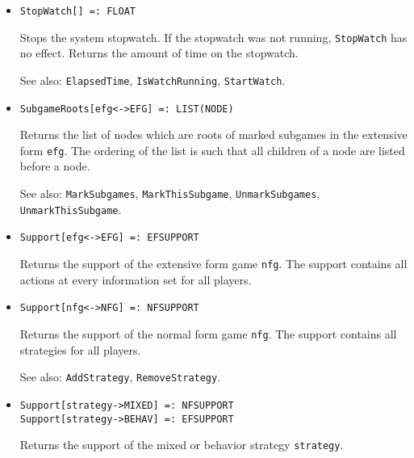 \begin{itemize}
\item
\protect \large \begin{verbatim}
StopWatch[] =: FLOAT
\end{verbatim}\normalsize

\bd
Stops the system stopwatch.  If the stopwatch was not
running, {\tt StopWatch} has no effect.  Returns the amount of time
on the stopwatch.
\item
[See also:] {\tt ElapsedTime}, {\tt IsWatchRunning}, {\tt StartWatch}.
\ed

\item
\protect \large \begin{verbatim}
SubgameRoots[efg<->EFG] =: LIST(NODE)
\end{verbatim}\normalsize

\bd Returns the list of nodes which are roots of marked subgames in
the extensive form {\tt efg}.  The ordering of the list is such that
all children of a node are listed before a node.
\item
[See also:] {\tt MarkSubgames}, {\tt MarkThisSubgame}, {\tt UnmarkSubgames},
{\tt UnmarkThisSubgame}.
\ed

\item
\protect \large \begin{verbatim}
Support[efg<->EFG] =: EFSUPPORT
\end{verbatim}\normalsize

\bd
Returns the support of the extensive form
game \verb+nfg+.  The support contains all actions at every
information set for all players.
\ed

\item
\protect \large \begin{verbatim}
Support[nfg<->NFG] =: NFSUPPORT
\end{verbatim}\normalsize

\bd
Returns the support of the normal form
game \verb+nfg+.  The support contains all strategies for all players.
\item
[See also:] {\tt AddStrategy}, {\tt RemoveStrategy}.
\ed

\item
\protect \large \begin{verbatim}
Support[strategy->MIXED] =: NFSUPPORT
Support[strategy->BEHAV] =: EFSUPPORT
\end{verbatim}\normalsize

\bd Returns the support of the mixed or behavior strategy
\verb+strategy+.  
\ed



\end{itemize}
